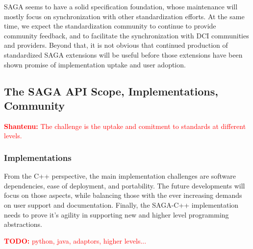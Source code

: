 \documentclass{article}
\newcommand{\B}[1]{\textbf{#1}}
\newcommand{\todo}[1]{{\textcolor{red}{\B{TODO:} #1 }}}
\newcommand{\jhanote}[1]{{\textcolor{red}{     \B{Shantenu:} #1 }}}
\newcommand{\todo}[1]{}
\newcommand{\jhanote}[1]{}
\begin{document}
  SAGA seems to have a solid specification foundation, whose maintenance
  will mostly focus on synchronization with other standardization
  efforts.  At the same time, we expect the standardization community to
  continue to provide community feedback, and to facilitate the
  synchronization with DCI communities and providers.  Beyond that, it
  is not obvious that continued production of standardized SAGA
  extensions will be useful before those extensions have been shown
  promise of implementation uptake and user adoption.  

  
 \subsection{The SAGA API Scope, Implementations, Community}

 \jhanote{The challenge is the uptake and comitment to standards at
   different levels.}

 \subsubsection{Implementations}

  From the C++ perspective, the main implementation challenges are
  software dependencies, ease of deployment, and portability.  The
  future developments will focus on those aspects, while balancing those
  with the ever increasing demands on user support and documentation.
  Finally, the SAGA-C++ implementation needs to prove it's agility in
  supporting new and higher level programming abstractions. 

  \todo{python, java, adaptors, higher levels...}


\end{document}
